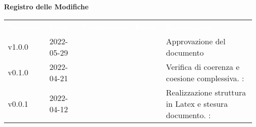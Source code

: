 

{\LARGE{\textbf{Registro delle Modifiche}}} \\
\begin{table}[!htbp]
	\renewcommand{\arraystretch}{1.5}
	\begin{tabular}{ m{}<{\centering}  m{}<{\centering}  m{}<{\centering}  m{}<{\centering}  m{}<{\centering} }
		\rowcolor{darkblue}
		\textcolor{white}{\textbf{Versione}} & \textcolor{white}{\textbf{Data}} & \textcolor{white}{\textbf{Nominativo}} & \textcolor{white}{\textbf{Ruolo}} & \textcolor{white}{\textbf{Descrizione}}                              \\
		v1.0.0                               & 2022-05-29                      & \MG                                       & \RE                               & Approvazione del documento                                           \\

		v0.1.0                               & 2022-04-21                      & \PV                                    & \AN                               & Verifica di coerenza e coesione complessiva. \VE: \textit{\GC}          \\

		v0.0.1                               & 2022-04-12                       & \PV                                    & \AN                               & Realizzazione struttura in Latex e stesura documento. \VE: \textit{\GC} \\
	\end{tabular}
\end{table}

\pagebreak